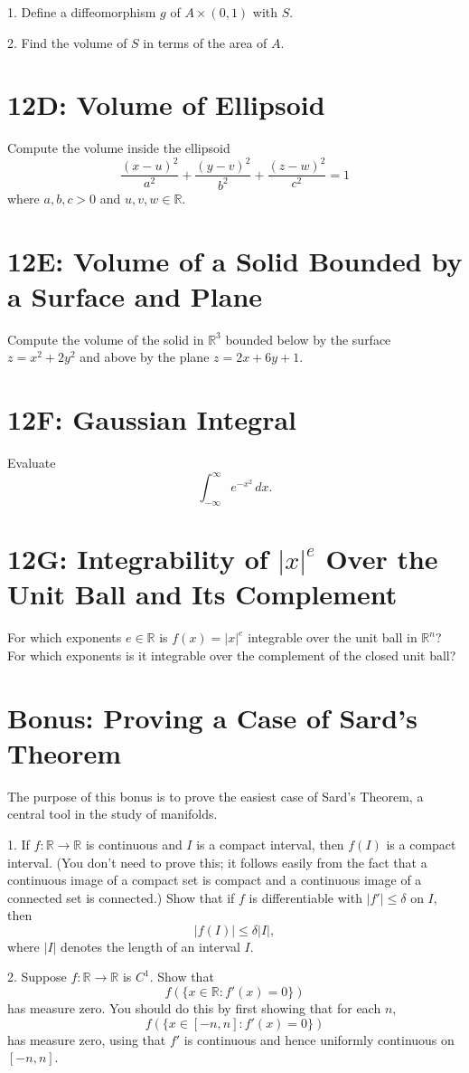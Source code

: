 \documentclass[lang=cn,11pt]{template}
\begin{document}
1. Define a diffeomorphism \( g \) of \( A \times (0, 1) \) with \( S \).

2. Find the volume of \( S \) in terms of the area of \( A \).

\section*{12D: Volume of Ellipsoid}
Compute the volume inside the ellipsoid
\[
\frac{(x - u)^2}{a^2} + \frac{(y - v)^2}{b^2} + \frac{(z - w)^2}{c^2} = 1
\]
where \( a, b, c > 0 \) and \( u, v, w \in \mathbb{R} \).

\section*{12E: Volume of a Solid Bounded by a Surface and Plane}
Compute the volume of the solid in \( \mathbb{R}^3 \) bounded below by the surface \( z = x^2 + 2y^2 \) and above by the plane \( z = 2x + 6y + 1 \).

\section*{12F: Gaussian Integral}
Evaluate
\[
\int_{-\infty}^{\infty} e^{-x^2} \, dx.
\]

\section*{12G: Integrability of \( |x|^e \) Over the Unit Ball and Its Complement}
For which exponents \( e \in \mathbb{R} \) is \( f(x) = |x|^e \) integrable over the unit ball in \( \mathbb{R}^n \)? For which exponents is it integrable over the complement of the closed unit ball?

\section*{Bonus: Proving a Case of Sard’s Theorem}
The purpose of this bonus is to prove the easiest case of Sard’s Theorem, a central tool in the study of manifolds.

1. If \( f : \mathbb{R} \rightarrow \mathbb{R} \) is continuous and \( I \) is a compact interval, then \( f(I) \) is a compact interval. (You don’t need to prove this; it follows easily from the fact that a continuous image of a compact set is compact and a continuous image of a connected set is connected.) Show that if \( f \) is differentiable with \( |f'| \leq \delta \) on \( I \), then
   \[
   |f(I)| \leq \delta |I|,
   \]
   where \( |I| \) denotes the length of an interval \( I \).

2. Suppose \( f : \mathbb{R} \rightarrow \mathbb{R} \) is \( C^1 \). Show that
   \[
   f(\{x \in \mathbb{R} : f'(x) = 0\})
   \]
   has measure zero. You should do this by first showing that for each \( n \),
   \[
   f(\{x \in [-n, n] : f'(x) = 0\})
   \]
   has measure zero, using that \( f' \) is continuous and hence uniformly continuous on \( [-n, n] \).
\end{document}
